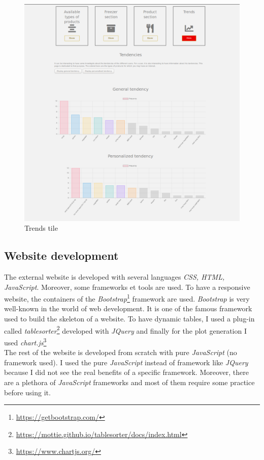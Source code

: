 \begin{figure}[H]
\centering
\includegraphics[scale=0.4]{./images/dashboard_trends.png}
\caption{Trends tile}
\label{fig:dashboard_trends}
\end{figure}

\subsection{Website development}
The external website is developed with several languages \textit{CSS, HTML, JavaScript}. Moreover, some frameworks et tools are used. To have a responsive website, the containers of the \textit{Bootstrap}\footnote{\url{https://getbootstrap.com/}} framework are used. \textit{Bootstrap} is very well-known in the world of web development. It is one of the famous framework used to build the skeleton of a website. To have dynamic tables, I used a plug-in called \textit{tablesorter}\footnote{\url{https://mottie.github.io/tablesorter/docs/index.html}} developed with \textit{JQuery} and finally for the plot generation I used \textit{chart.js}\footnote{\url{https://www.chartjs.org/}} \\

The rest of the website is developed from scratch with pure \textit{JavaScript} (no framework used). I used the pure \textit{JavaScript} instead of framework like \textit{JQuery} because I did not see the real benefits of a specific framework. Moreover, there are a plethora of \textit{JavaScript} frameworks and most of them require some practice before using it.\\
\newpage

